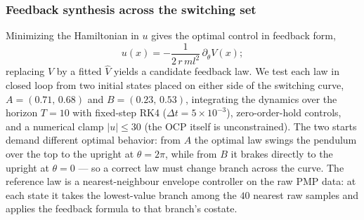 \documentclass[11pt]{amsart}
\theoremstyle{definition}
\theoremstyle{remark}
\begin{document}
\subsubsection{Feedback synthesis across the switching set}
Minimizing the Hamiltonian in $u$ gives the optimal control in feedback form,
\begin{equation*}
u(x) = -\frac{1}{2\,r\,ml^{2}}\,\partial_{\dot{\theta}}V(x);
\end{equation*}
replacing $V$ by a fitted $\hat V$ yields a candidate feedback law. We test
each law in closed loop from two initial states placed on either side of the
switching curve, $A=(0.71,\,0.68)$ and $B=(0.23,\,0.53)$, integrating the
dynamics over the horizon $T=10$ with fixed-step RK4 ($\Delta t = 5\times10^{-3}$),
zero-order-hold controls, and a numerical clamp $|u| \le 30$ (the OCP itself is
unconstrained). The two starts demand different optimal
behavior: from $A$ the optimal law swings the pendulum over the top to the
upright at $\theta=2\pi$, while from $B$ it brakes directly to the upright at
$\theta=0$ --- so a correct law must change branch across the curve. The
reference law is a nearest-neighbour envelope controller on the raw PMP data:
at each state it takes the lowest-value branch among the $40$ nearest raw
samples and applies the feedback formula to that branch's costate.
\end{document}
